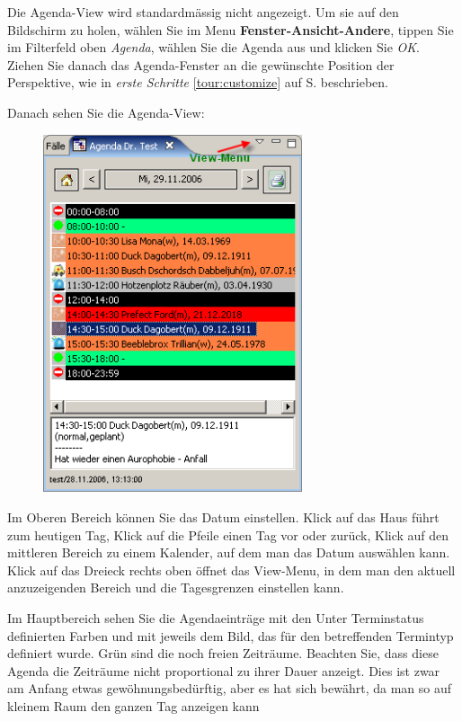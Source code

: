 Die Agenda-View wird standardmässig nicht angezeigt. Um sie auf den Bildschirm zu holen, wählen Sie im Menu
 \textbf{Fenster-Ansicht-Andere}, tippen Sie im Filterfeld oben \textit{Agenda}, wählen Sie die Agenda aus und
 klicken Sie \textit{OK}. Ziehen Sie danach das Agenda-Fenster an die gewünschte Position der Perspektive, wie in \textit{erste Schritte} \ref{tour:customize} auf S. \pageref{tour:customize} beschrieben.

Danach sehen Sie die Agenda-View:\\

\begin{figure}
\includegraphics[width=3in]{images/use2.png}
\end{figure}


Im Oberen Bereich können Sie das Datum einstellen. Klick auf das Haus führt zum heutigen Tag, Klick auf die Pfeile einen Tag vor oder
zurück, Klick auf den mittleren Bereich zu einem Kalender, auf dem man das Datum auswählen kann.
Klick auf das Dreieck rechts oben öffnet das View-Menu, in dem man den aktuell anzuzeigenden Bereich und die Tagesgrenzen
einstellen kann.

Im Hauptbereich sehen Sie die Agendaeinträge mit den Unter Terminstatus definierten Farben und mit jeweils dem Bild, das für den betreffenden Termintyp definiert wurde. Grün sind die noch freien  Zeiträume. Beachten Sie, dass diese Agenda die Zeiträume nicht proportional zu ihrer Dauer anzeigt. Dies ist zwar am Anfang etwas gewöhnungsbedürftig, aber es hat sich bewährt, da man so auf kleinem Raum den ganzen Tag anzeigen kann

